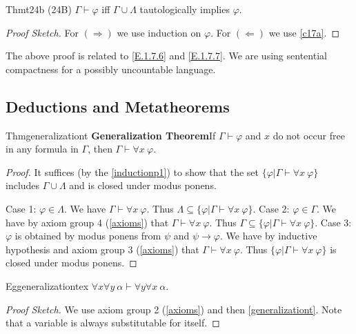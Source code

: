 \begin{reference}{Thm}{t24b}
  (24B) $\Gamma\vdash \varphi$ iff $\Gamma\cup \Lambda$ tautologically implies $\varphi$.
\end{reference}

\begin{proof}[Proof Sketch]
  For $(\Rightarrow)$ we use induction on $\varphi$. For $(\Leftarrow)$ we use \ref{c17a}.
\end{proof}

The above proof is related to \ref{E.1.7.6} and \ref{E.1.7.7}. We are using sentential compactness for a possibly uncountable language.

\subsection*{Deductions and Metatheorems}

\begin{reference}{Thm}{generalizationt}
  \textbf{Generalization Theorem}\quad If $\Gamma\vdash \varphi$ and $x$ do not occur free in any formula in $\Gamma$, then $\Gamma\vdash\forall x\ \varphi$.
\end{reference}

\begin{proof}
  It suffices (by the \ref{inductionp1}) to show that the set $\{\varphi|\Gamma\vdash\forall x\ \varphi\}$ includes $\Gamma\cup \Lambda$ and is closed under modus ponens.

  Case 1: $\varphi\in \Lambda$. We have $\Gamma\vdash\forall x\ \varphi$. Thus $\Lambda\subseteq\{\varphi|\Gamma\vdash\forall x\ \varphi\}$.\newline
  Case 2: $\varphi\in \Gamma$. We have by axiom group 4 (\ref{axioms}) that $\Gamma\vdash\forall x\ \varphi$. Thus $\Gamma\subseteq\{\varphi|\Gamma\vdash\forall x\ \varphi\}$.\newline
  Case 3: $\varphi$ is obtained by modus ponens from $\psi$ and $\psi\rightarrow \varphi$. We have by inductive hypothesis and axiom group 3 (\ref{axioms}) that $\Gamma\vdash\forall x\ \varphi$. Thus $\{\varphi|\Gamma\vdash\forall x\ \varphi\}$ is closed under modus ponens.
\end{proof}

\begin{reference}{Eg}{generalizationtex}
  $\forall x\forall y\ \alpha\vdash\forall y\forall x\ \alpha$.
\end{reference}

\begin{proof}[Proof Sketch]
  We use axiom group 2 (\ref{axioms}) and then \ref{generalizationt}. Note that a variable is always substitutable for itself.
\end{proof}

